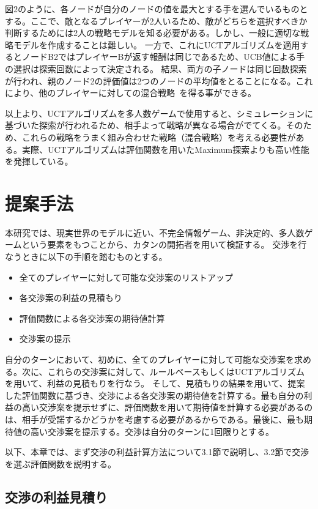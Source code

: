 \documentclass[a4, 10pt,dvipdfmx]{jsarticle}
\begin{document}
図2のように、各ノードが自分のノードの値を最大とする手を選んでいるものとする。ここで、敵となるプレイヤーが2人いるため、敵がどちらを選択すべきか判断するためには2人の戦略モデルを知る必要がある。しかし、一般に適切な戦略モデルを作成することは難しい。
一方で、これにUCTアルゴリズムを適用するとノードB2ではプレイヤーBが返す報酬は同じであるため、UCB値による手の選択は探索回数によって決定される。
結果、両方の子ノードは同じ回数探索が行われ、親のノード2の評価値は2つのノードの平均値をとることになる。これにより、他のプレイヤーに対しての混合戦略~\cite{nash1951non}を得る事ができる。

以上より、UCTアルゴリズムを多人数ゲームで使用すると、シミュレーションに基づいた探索が行われるため、相手よって戦略が異なる場合がでてくる。そのため、これらの戦略をうまく組み合わせた戦略（混合戦略）を考える必要性がある。実際、UCTアルゴリズムは評価関数を用いたMaximum探索よりも高い性能を発揮している。


\section{提案手法}

本研究では、現実世界のモデルに近い、不完全情報ゲーム、非決定的、多人数ゲームという要素をもつことから、カタンの開拓者を用いて検証する。
交渉を行なうときに以下の手順を踏むものとする。
\begin{itemize}
 \item 全てのプレイヤーに対して可能な交渉案のリストアップ
 \item 各交渉案の利益の見積もり
 \item 評価関数による各交渉案の期待値計算
 \item 交渉案の提示
\end{itemize}
自分のターンにおいて、初めに、全てのプレイヤーに対して可能な交渉案を求める。次に、これらの交渉案に対して、ルールベースもしくはUCTアルゴリズムを用いて、利益の見積もりを行なう。
そして、見積もりの結果を用いて、提案した評価関数に基づき、交渉による各交渉案の期待値を計算する。最も自分の利益の高い交渉案を提示せずに、評価関数を用いて期待値を計算する必要があるのは、相手が受諾するかどうかを考慮する必要があるからである。最後に、最も期待値の高い交渉案を提示する。交渉は自分のターンに1回限りとする。

以下、本章では、まず交渉の利益計算方法について3.1節で説明し、3.2節で交渉を選ぶ評価関数を説明する。

\subsection{交渉の利益見積り}
\end{document}
